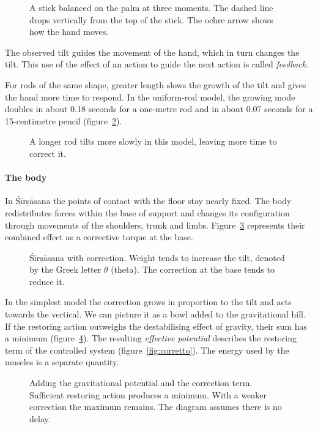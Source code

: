 \begin{figure}
\caption{A stick balanced on the palm at three moments. The dashed line drops vertically from the top of the stick. The ochre arrow shows how the hand moves.}
\label{fig:bastone}
\end{figure}

The observed tilt guides the movement of the hand, which in turn changes the tilt. This use of the effect of an action to guide the next action is called \emph{feedback}.

For rods of the same shape, greater length slows the growth of the tilt and gives the hand more time to respond. In the uniform-rod model, the growing mode doubles in about 0.18 seconds for a one-metre rod and in about 0.07 seconds for a 15-centimetre pencil (figure~\ref{fig:lungocorto}).

\begin{figure}
\caption{A longer rod tilts more slowly in this model, leaving more time to correct it.}
\label{fig:lungocorto}
\end{figure}

\paragraph{The body} In Śīrṣāsana the points of contact with the floor stay nearly fixed. The body redistributes forces within the base of support and changes its configuration through movements of the shoulders, trunk and limbs. Figure~\ref{fig:pendolo} represents their combined effect as a corrective torque at the base.

\begin{figure}
\caption{Śīrṣāsana with correction. Weight tends to increase the tilt, denoted by the Greek letter $\theta$ (theta). The correction at the base tends to reduce it.}
\label{fig:pendolo}
\end{figure}

In the simplest model the correction grows in proportion to the tilt and acts towards the vertical. We can picture it as a bowl added to the gravitational hill. If the restoring action outweighs the destabilising effect of gravity, their sum has a minimum (figure~\ref{fig:somma}). The resulting \emph{effective potential} describes the restoring term of the controlled system (figure~\ref{fig:corretto}). The energy used by the muscles is a separate quantity.

\begin{figure}
\caption{Adding the gravitational potential and the correction term. Sufficient restoring action produces a minimum. With a weaker correction the maximum remains. The diagram assumes there is no delay.}
\label{fig:somma}
\end{figure}


